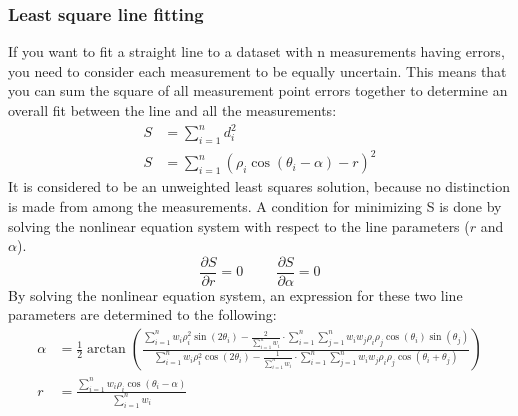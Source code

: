 \documentclass[../Head/Main.tex]{subfiles}
\begin{document}
\subsubsection{Least square line fitting}
If you want to fit a straight line to a dataset with n measurements having errors, you need to consider each measurement to be equally uncertain. This means that you can sum the square of all measurement point errors together to determine an overall fit between the line and all the measurements:
\begin{align}
    S &= \sum_{i = 1}^{n}d_i^2 \\
    S &= \sum_{i = 1}^{n}\left(\rho_i\cos(\theta_i - \alpha) - r\right)^2
\end{align} 
It is considered to be an unweighted least squares solution, because no distinction is made from among the measurements. A condition for minimizing S is done by solving the nonlinear equation system with respect to the line parameters ($r$ and $\alpha$).
$$\frac{\partial S}{\partial r} = 0 \hspace{1cm} \frac{\partial S}{\partial \alpha} = 0$$
By solving the nonlinear equation system, an expression for these two line parameters are determined to the following:
\begin{align}
    \alpha &= \frac{1}{2}\arctan\left(\frac{\sum_{i = 1}^{n} w_i\rho_i^2 \sin(2\theta_i) - \frac{2}{\sum_{i = 1}^{n} w_i}\cdot\sum_{i = 1}^{n}\sum_{j = 1}^{n}w_{i}w_{j}\rho_{i}\rho_{j}\cos(\theta_i)\sin(\theta_j)}{\sum_{i = 1}^{n}w_i\rho_i^2\cos(2\theta_i) - \frac{1}{\sum_{i = 1}^{n} w_i}\cdot\sum_{i = 1}^{n}\sum_{j = 1}^{n}w_{i}w_{j}\rho_{i}\rho_{j}\cos(\theta_i + \theta_j)}\right) \\
    r &= \frac{\sum_{i = 1}^{n}w_i\rho_i\cos(\theta_i - \alpha)}{\sum_{i = 1}^{n}w_i}
\end{align}
\end{document}
